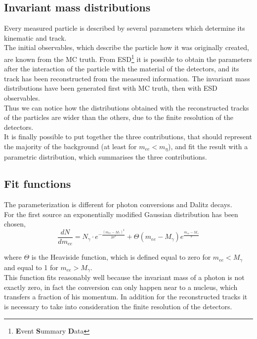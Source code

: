 \documentclass[a4paper,twocolumn,gsifonts,twoside]{gsipaper}
\begin{document}
\subsection{Invariant mass distributions}
Every measured particle is described by several parameters which determine its kinematic and track.\\
The initial observables, which describe the particle how it was originally created, are known from the MC truth.
From ESD\footnote{\textbf{E}vent \textbf{S}ummary \textbf{D}ata} it is possible to obtain the parameters after the interaction
of the particle with the material of the detectors,  and its track has been reconstructed from the measured information. 
The invariant mass distributions have been generated first with MC truth, then with ESD observables.\\ 
Thus we can notice how the distributions obtained with the reconstructed tracks of the particles are wider than the others,
due to the finite resolution of the detectors.\\
It is finally possible to put together the three contributions, that should represent the majority of the background (at least for 
$m_{ee} < m_{\eta}$), and fit the result with a parametric distribution, which summarises the three contributions.\\

\subsection{Fit functions}
\label{subsec:fit}

The parameterization is different for photon conversions and Dalitz decays.\\
For the first source an exponentially modified Gaussian distribution has been chosen, 
\begin{equation}
\frac{dN}{dm_{ee}}=N_{\gamma}\cdot e^{-\frac{(m_{ee}-M_{\gamma})^{2}}{2\sigma^{2}}}+\Theta(m_{ee}-M_{\gamma})
e^{\frac{m_{ee}-M_{\gamma}}{\tau}}
\label{gaussexp}
\end{equation}

where $\Theta$ is the Heaviside function, which is defined equal to zero for $m_{ee} < M_{\gamma}$ and equal to 1 for 
$m_{ee} > M_{\gamma}$.\\

This function fits reasonably well because the invariant mass of a photon is not exactly zero, in fact the conversion can only happen
near to a nucleus, which transfers a fraction of his momentum. In addition for the reconstructed tracks it is necessary to take into 
consideration the finite resolution of the detectors.\\
\end{document}
